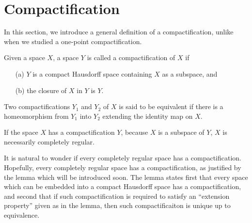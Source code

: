 \section{Compactification}

In this section, we introduce a general definition of a compactification, unlike when we studied a one-point compactification.
\begin{defi}[Compactification]
    Given a space $X$, a space $Y$ is called a compactification of $X$ if
    \begin{enumerate}
        \item[(a)] $Y$ is a compact Hausdorff space containing $X$ as a subspace, and
        \item[(b)] the closure of $X$ in $Y$ is $Y$.
    \end{enumerate}
    Two compactifications $Y_1$ and $Y_2$ of $X$ is said to be equivalent if there is a homeomorphism from $Y_1$ into $Y_2$ extending the identity map on $X$.
\end{defi}
\begin{rmk}
    If the space $X$ has a compactification $Y$, because $X$ is a subspace of $Y$, $X$ is necessarily completely regular.
\end{rmk}
It is natural to wonder if every completely regular space has a compactification.
Hopefully, every completely regular space has a compactification, as justified by the lemma which will be introduced soon.
The lemma states first that every space which can be embedded into a compact Hausdorff space has a compactification, and second that if such compactification is required to satisfy an ``extension property'' given as in the lemma, then such compactificaiton is unique up to equivalence.

